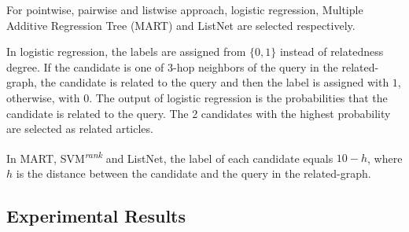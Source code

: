 For pointwise, pairwise and listwise approach, logistic regression, Multiple Additive Regression Tree (MART) \citep{friedman2002stochastic} and ListNet \citep{cao2007learning} are selected respectively. 

In logistic regression, the labels are assigned from $\{0, 1\}$ instead of relatedness degree. If the candidate is one of $3$-hop neighbors of the query in the related-graph, the candidate is related to the query and then the label is assigned with $1$, otherwise, with $0$. The output of logistic regression is the probabilities that the candidate is related to the query. The 2 candidates with the highest probability are selected as related articles. 

In MART, SVM\textsuperscript{\textit{rank}} and ListNet, the label of each candidate equals $10 - h$, where $h$ is the distance between the candidate and the query in the related-graph. 



\subsection{Experimental Results}
\label{sec:6.4}

